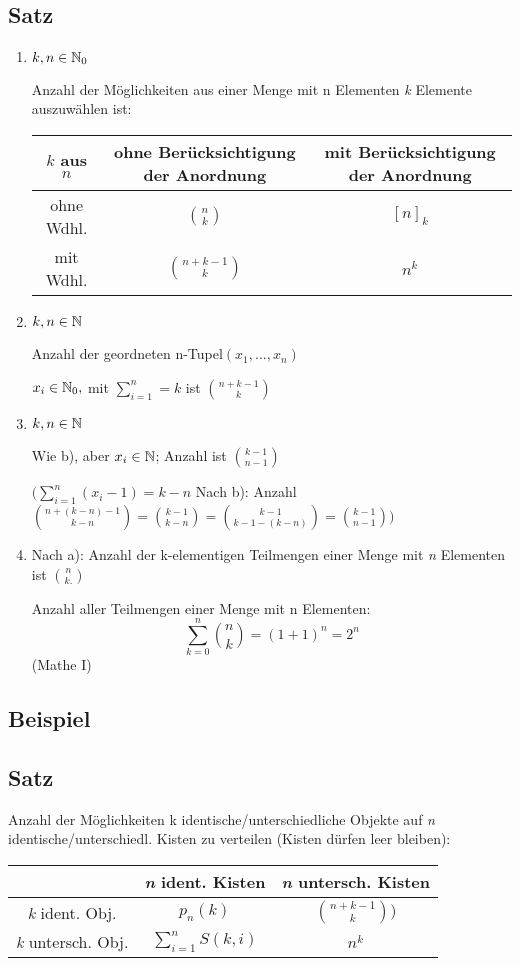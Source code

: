 \subsection{Satz}
\begin{enumerate}
\item $k,n \in \operatorname{\mathbb{N}}_0$

Anzahl der Möglichkeiten aus einer Menge mit n Elementen \textit{k} Elemente auszuwählen ist:


\begin{tabular}{c|c|c}
	$k$ aus $n$ & ohne Berücksichtigung der Anordnung & mit Berücksichtigung der Anordnung\\ \hline
	ohne Wdhl. & $\binom{n}{k}$ & $[n]_k$\\ \hline
	mit Wdhl. & $\binom{n+k-1}{k} $& $n^k$
\end{tabular}


\item $k,n \in \operatorname{\mathbb{N}}$

Anzahl der geordneten n-Tupel$(x_1,...,x_n)$

$x_i\in \operatorname{\mathbb{N}}_0,$ mit $\sum_{i=1}^{n} = k$ ist $\binom{n+k-1}{k}$

\item $k,n \in \operatorname{\mathbb{N}}$

Wie b), aber $x_i \in \operatorname{\mathbb{N}}$; Anzahl ist $\binom{k-1}{n-1}$

$ \Biggl( \sum_{i=1}^{n}(x_i-1)=k-n$ \quad Nach b): Anzahl $\binom{n+(k-n)-1}{k-n} = \binom{k-1}{k-n}=\binom{k-1}{k-1-(k-n)} = \binom{k-1}{n-1} \Biggr) $ 
\item Nach a): Anzahl der k-elementigen Teilmengen einer Menge mit \textit{n} Elementen ist $\binom{n}{k.}$

Anzahl aller Teilmengen einer Menge mit n Elementen:
$$ \sum_{k=0}^{n}\binom{n}{k}= (1+1)^n = 2^n$$ (Mathe I)
\end{enumerate}

\subsection{Beispiel}

\subsection{Satz}
Anzahl der Möglichkeiten k identische/unterschiedliche Objekte auf \textit{n} identische/unterschiedl. Kisten zu verteilen (Kisten dürfen leer bleiben):

\begin{tabular}{c|c|c}
	& \textit{n} ident. Kisten & \textit{n} untersch. Kisten \\ \hline
	\textit{k} ident. Obj. &$p_n(k)$ &$\binom{n+k-1}{k})$ \\ \hline
	\textit{k} untersch. Obj. & $\sum_{i=1}^{n} S(k,i)$&$n^k$ 
\end{tabular}

